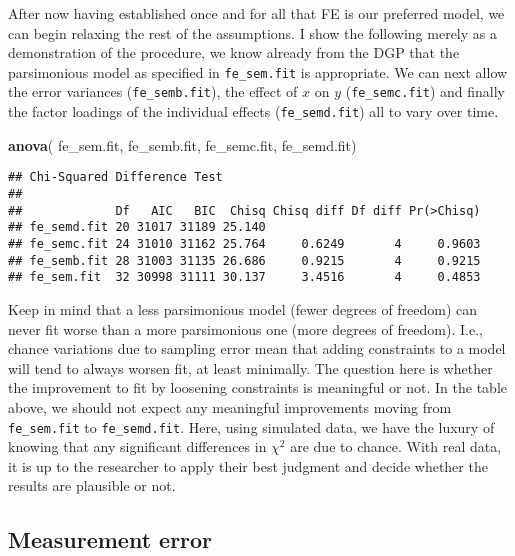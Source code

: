 \documentclass[]{interact}
\theoremstyle{plain}%
\theoremstyle{definition}
\theoremstyle{remark}
\newenvironment{Shaded}{\begin{snugshade}}{\end{snugshade}}
\newcommand{\KeywordTok}[1]{\textcolor[rgb]{0.13,0.29,0.53}{\textbf{#1}}}
\newcommand{\NormalTok}[1]{#1}
\begin{document}
After now having established once and for all that FE is our preferred
model, we can begin relaxing the rest of the assumptions. I show the
following merely as a demonstration of the procedure, we know already
from the DGP that the parsimonious model as specified in
\texttt{fe\_sem.fit} is appropriate. We can next allow the error
variances (\texttt{fe\_semb.fit}), the effect of \(x\) on \(y\)
(\texttt{fe\_semc.fit}) and finally the factor loadings of the
individual effects (\texttt{fe\_semd.fit}) all to vary over time.

\singlespacing

\doublespacing

\small
\singlespacing

\begin{Shaded}
\begin{Highlighting}[]
\KeywordTok{anova}\NormalTok{( fe\_sem.fit, fe\_semb.fit, fe\_semc.fit, fe\_semd.fit)}
\end{Highlighting}
\end{Shaded}

\begin{verbatim}
## Chi-Squared Difference Test
## 
##             Df   AIC   BIC  Chisq Chisq diff Df diff Pr(>Chisq)
## fe_semd.fit 20 31017 31189 25.140                              
## fe_semc.fit 24 31010 31162 25.764     0.6249       4     0.9603
## fe_semb.fit 28 31003 31135 26.686     0.9215       4     0.9215
## fe_sem.fit  32 30998 31111 30.137     3.4516       4     0.4853
\end{verbatim}

\doublespacing
\normalsize

Keep in mind that a less parsimonious model (fewer degrees of freedom)
can never fit worse than a more parsimonious one (more degrees of
freedom). I.e., chance variations due to sampling error mean that adding
constraints to a model will tend to always worsen fit, at least
minimally. The question here is whether the improvement to fit by
loosening constraints is meaningful or not. In the table above, we
should not expect any meaningful improvements moving from
\texttt{fe\_sem.fit} to \texttt{fe\_semd.fit}. Here, using simulated
data, we have the luxury of knowing that any significant differences in
\(\chi^{2}\) are due to chance. With real data, it is up to the
researcher to apply their best judgment and decide whether the results
are plausible or not.

\hypertarget{measerr}{%
\subsection{Measurement error}\label{measerr}}
\end{document}
